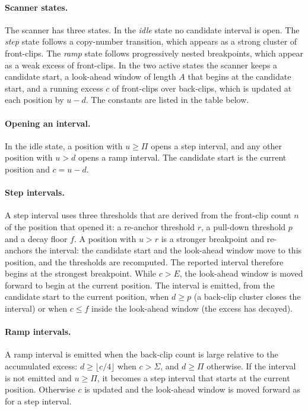 \documentclass[11pt,a4paper]{article}
\begin{document}
\paragraph{Scanner states.} The scanner has three states. In the \emph{idle} state no candidate interval is open. The \emph{step} state follows a copy-number transition, which appears as a strong cluster of front-clips. The \emph{ramp} state follows progressively nested breakpoints, which appear as a weak excess of front-clips. In the two active states the scanner keeps a candidate start, a look-ahead window of length $A$ that begins at the candidate start, and a running excess $c$ of front-clips over back-clips, which is updated at each position by $u-d$. The constants are listed in the table below.

\paragraph{Opening an interval.} In the idle state, a position with $u \ge \Pi$ opens a step interval, and any other position with $u > d$ opens a ramp interval. The candidate start is the current position and $c = u - d$.

\paragraph{Step intervals.} A step interval uses three thresholds that are derived from the front-clip count $n$ of the position that opened it: a re-anchor threshold $r$, a pull-down threshold $p$ and a decay floor $f$. A position with $u > r$ is a stronger breakpoint and re-anchors the interval: the candidate start and the look-ahead window move to this position, and the thresholds are recomputed. The reported interval therefore begins at the strongest breakpoint. While $c > E$, the look-ahead window is moved forward to begin at the current position. The interval is emitted, from the candidate start to the current position, when $d \ge p$ (a back-clip cluster closes the interval) or when $c \le f$ inside the look-ahead window (the excess has decayed).

\paragraph{Ramp intervals.} A ramp interval is emitted when the back-clip count is large relative to the accumulated excess: $d \ge \lfloor c/4 \rfloor$ when $c > \Sigma$, and $d \ge \Pi$ otherwise. If the interval is not emitted and $u \ge \Pi$, it becomes a step interval that starts at the current position. Otherwise $c$ is updated and the look-ahead window is moved forward as for a step interval.
\end{document}

